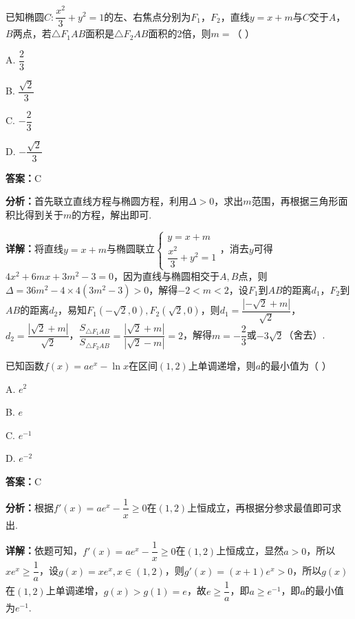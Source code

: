 \begin{question}[points=5]
已知椭圆$C:\dfrac{x^{2}}{3}+y^{2}=1$的左、右焦点分别为$F_{1}$，$F_{2}$，直线$y=x+m$与$C$交于$A$，$B$两点，若$\triangle F_{1}AB$面积是$\triangle F_{2}AB$面积的2倍，则$m=$（ \quad ）
\begin{choices}
  \item A. $\dfrac{2}{3}$
  \item B. $\dfrac{\sqrt{2}}{3}$
  \item C. $-\dfrac{2}{3}$
  \item D. $-\dfrac{\sqrt{2}}{3}$
\end{choices}
\begin{solution}
\textbf{答案：}C

\textbf{分析：}首先联立直线方程与椭圆方程，利用$\Delta>0$，求出$m$范围，再根据三角形面积比得到关于$m$的方程，解出即可.

\textbf{详解：}将直线$y=x+m$与椭圆联立$\begin{cases}y=x+m\\ \dfrac{x^{2}}{3}+y^{2}=1\end{cases}$，消去$y$可得$4x^{2}+6mx+3m^{2}-3=0$，因为直线与椭圆相交于$A,B$点，则$\Delta=36m^{2}-4\times4(3m^{2}-3)>0$，解得$-2<m<2$，设$F_{1}$到$AB$的距离$d_{1}$，$F_{2}$到$AB$的距离$d_{2}$，易知$F_{1}(-\sqrt{2},0),F_{2}(\sqrt{2},0)$，则$d_{1}=\dfrac{|-\sqrt{2}+m|}{\sqrt{2}}$，$d_{2}=\dfrac{|\sqrt{2}+m|}{\sqrt{2}}$，$\dfrac{S_{\triangle F_{1}AB}}{S_{\triangle F_{2}AB}}=\dfrac{|\sqrt{2}+m|}{|\sqrt{2}-m|}=2$，解得$m=-\dfrac{2}{3}$或$-3\sqrt{2}$（舍去）.
\end{solution}
\end{question}

\begin{question}[points=5]
已知函数$f(x)=ae^{x}-\ln x$在区间$(1,2)$上单调递增，则$a$的最小值为（ \quad ）
\begin{choices}
  \item A. $e^{2}$
  \item B. $e$
  \item C. $e^{-1}$
  \item D. $e^{-2}$
\end{choices}
\begin{solution}
\textbf{答案：}C

\textbf{分析：}根据$f'(x)=ae^{x}-\dfrac{1}{x}\ge0$在$(1,2)$上恒成立，再根据分参求最值即可求出.

\textbf{详解：}依题可知，$f'(x)=ae^{x}-\dfrac{1}{x}\ge0$在$(1,2)$上恒成立，显然$a>0$，所以$xe^{x}\ge\dfrac{1}{a}$，设$g(x)=xe^{x},x\in(1,2)$，则$g'(x)=(x+1)e^{x}>0$，所以$g(x)$在$(1,2)$上单调递增，$g(x)>g(1)=e$，故$e\ge\dfrac{1}{a}$，即$a\ge e^{-1}$，即$a$的最小值为$e^{-1}$.
\end{solution}
\end{question}

